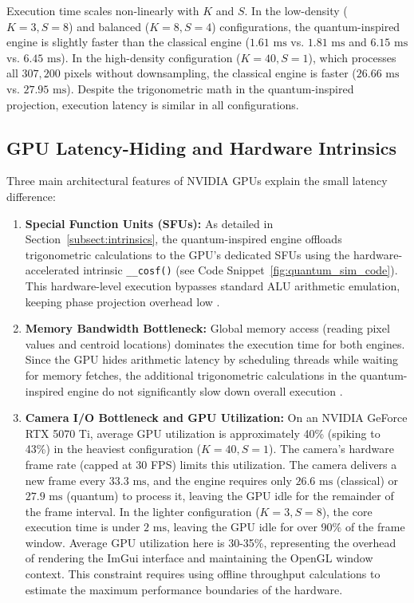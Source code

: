 Execution time scales non-linearly with $K$ and $S$. In the low-density ($K=3, S=8$) and balanced ($K=8, S=4$) configurations, the quantum-inspired engine is slightly faster than the classical engine ($1.61\text{ ms}$ vs. $1.81\text{ ms}$ and $6.15\text{ ms}$ vs. $6.45\text{ ms}$). In the high-density configuration ($K=40, S=1$), which processes all $307,200$ pixels without downsampling, the classical engine is faster ($26.66\text{ ms}$ vs. $27.95\text{ ms}$). Despite the trigonometric math in the quantum-inspired projection, execution latency is similar in all configurations.

\subsection{GPU Latency-Hiding and Hardware Intrinsics}
Three main architectural features of NVIDIA GPUs explain the small latency difference:

\begin{enumerate}
    \item \textbf{Special Function Units (SFUs):} As detailed in Section~\ref{subsect:intrinsics}, the quantum-inspired engine offloads trigonometric calculations to the GPU's dedicated SFUs using the hardware-accelerated intrinsic \texttt{\_\_cosf()} (see Code Snippet~\ref{fig:quantum_sim_code}). This hardware-level execution bypasses standard ALU arithmetic emulation, keeping phase projection overhead low \cite{CudaGuide, cook2012cuda}.
    \item \textbf{Memory Bandwidth Bottleneck:} Global memory access (reading pixel values and centroid locations) dominates the execution time for both engines. Since the GPU hides arithmetic latency by scheduling threads while waiting for memory fetches, the additional trigonometric calculations in the quantum-inspired engine do not significantly slow down overall execution \cite{CudaGuide, farivar2008parallel}.
    \item \textbf{Camera I/O Bottleneck and GPU Utilization:} On an NVIDIA GeForce RTX 5070 Ti, average GPU utilization is approximately 40\% (spiking to 43\%) in the heaviest configuration ($K=40, S=1$). The camera's hardware frame rate (capped at 30 FPS) limits this utilization. The camera delivers a new frame every $33.3\text{ ms}$, and the engine requires only $26.6\text{ ms}$ (classical) or $27.9\text{ ms}$ (quantum) to process it, leaving the GPU idle for the remainder of the frame interval. In the lighter configuration ($K=3, S=8$), the core execution time is under $2\text{ ms}$, leaving the GPU idle for over 90\% of the frame window. Average GPU utilization here is 30-35\%, representing the overhead of rendering the ImGui interface and maintaining the OpenGL window context. This constraint requires using offline throughput calculations to estimate the maximum performance boundaries of the hardware.
\end{enumerate}

